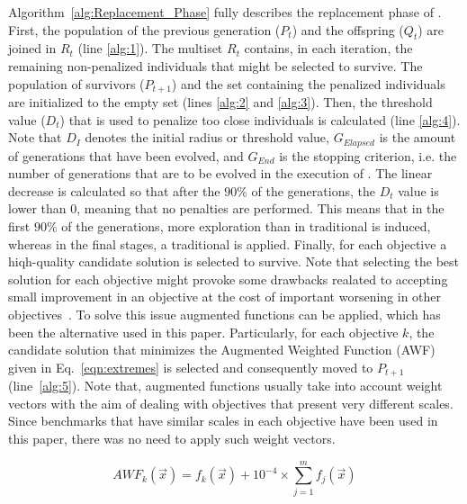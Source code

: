 Algorithm~\ref{alg:Replacement_Phase} fully describes the replacement phase of \VSDMOEA{}.
%
First, the population of the previous generation ($P_t$) and the offspring ($Q_t$) are joined
in $R_t$ (line \ref{alg:1}).
%
The multiset $R_t$ contains, in each iteration, the remaining non-penalized individuals that might be selected 
to survive.
%
The population of survivors ($P_{t+1}$) and the set containing the penalized individuals are initialized to
the empty set (lines \ref{alg:2} and \ref{alg:3}).
%
Then, the threshold value ($D_t$) that is used to penalize too close individuals is calculated (line \ref{alg:4}).
%
Note that $D_I$ denotes the initial radius or threshold value, $G_{Elapsed}$ is the amount of generations that have 
been evolved, and $G_{End}$ is the stopping criterion, i.e. the number of generations that are to be evolved 
in the execution of \VSDMOEA{}.
%
The linear decrease is calculated so that after the $90\%$ of the generations, the $D_t$ value is lower than 0, 
meaning that no penalties are performed.
%
This means that in the first $90\%$ of the generations, more exploration than in traditional \MOEAS{} is induced, 
whereas in the final stages, a traditional \MOEA{} is applied.
%
Finally, for each objective a hiqh-quality candidate solution is selected to survive.
%
Note that selecting the best solution for each objective might provoke some drawbacks realated to accepting small improvement
in an objective at the cost of important worsening in other objectives~\cite{deb2016optimality}.
%
To solve this issue augmented functions can be applied, which has been the alternative used in this paper.
%
Particularly, for each objective $k$, the candidate solution that minimizes the Augmented Weighted Function (AWF)
given in Eq.~\ref{eqn:extremes} is selected and consequently moved to $P_{t+1}$ (line~\ref{alg:5}).
%
Note that, augmented functions usually take into account weight vectors with the aim of dealing with objectives
that present very different scales.
%
Since benchmarks that have similar scales in each objective have been used in this paper, there was no need to apply
such weight vectors.

\begin{equation}\label{eqn:extremes}
AWF_k (\vec{x}) = f_k(\vec{x}) + 10^{-4} \times  \sum_{j=1}^m f_j( \vec{x} )
\end{equation}


